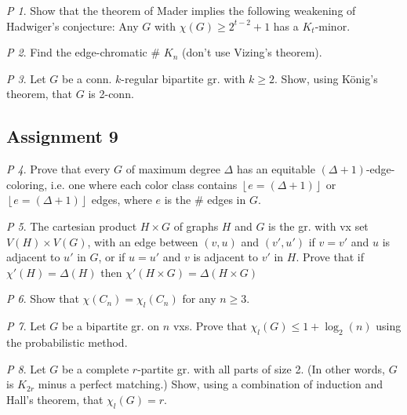 \documentclass[11pt, fleqn, a4paper, landscape]{article}
\theoremstyle{plain} %
\theoremstyle{remark} %
\newtheorem{problem}{P}
\theoremstyle{definition} %
\begin{document}
\begin{multicols}{5}
\begin{problem}
Show that the theorem of Mader implies the following weakening of Hadwiger's
conjecture: Any $G$ with $\chi(G) \ge 2^{t-2} + 1$ has a $K_t$-minor.
\end{problem}

\begin{problem}
Find the edge-chromatic \# $K_n$ (don't use Vizing's theorem).
\end{problem}

\begin{problem}
Let $G$ be a conn. $k$-regular bipartite gr. with $k\ge 2$. Show, using König's theorem, that $G$ is 2-conn.
\end{problem}

\subsection{Assignment 9}

\begin{problem}
Prove that every $G$ of maximum degree $\Delta$ has an equitable $(\Delta + 1)$-edge-coloring, i.e. one where each color class contains $\left\lfloor e=(\Delta + 1)\right\rfloor$ or $\left\lfloor e=(\Delta + 1)\right\rfloor$ edges, where $e$ is the \# edges in $G$.
\end{problem}

\begin{problem}
The cartesian product $H \times G $ of graphs $H$ and $G$ is the gr. with vx set $V (H)\times V (G)$, with an edge between $(v, u)$ and $(v', u')$ if $v = v'$ and $u$ is adjacent to $u'$ in $G$, or
if $u = u'$ and $v$ is adjacent to $v'$ in $H$. Prove that if $\chi'(H) = \Delta(H)$ then $\chi'(H\times G) = \Delta(H\times G)$
\end{problem}

\begin{problem}
Show that $\chi(C_n) = \chi_l(C_n)$ for any $n \ge 3$.
\end{problem}

\begin{problem}
Let $G$ be a bipartite gr. on $n$ vxs. Prove that $\chi_l(G)\le 1 + \log_2(n)$ using the probabilistic method.
\end{problem}

\begin{problem}
Let $G$ be a complete $r$-partite gr. with all parts of size 2. (In other words, $G$ is $K_{2r}$ minus a perfect matching.) Show, using a combination of induction and Hall's theorem, that $\chi_l(G) = r$.
\end{problem}


\end{multicols}
\end{document}
